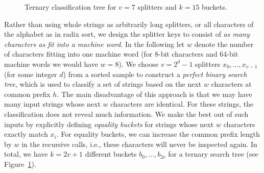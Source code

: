 \documentclass[a4paper]{myjournal}
\begin{document}
\begin{figure}[t]
   \caption{Ternary classification tree for $v = 7$ splitters and $k = 15$ buckets.}\label{fig:ternary-tree}
\end{figure}

Rather than using whole strings as arbitrarily long splitters, or all characters
of the alphabet as in radix sort, we design the splitter keys to consist of
\emph{as many characters as fit into a machine word}.  In the following let $w$
denote the number of characters fitting into one machine word (for 8-bit
characters and 64-bit machine words we would have $w=8$).  We choose $v=2^d-1$
splitters $x_0,\ldots,x_{v-1}$ (for some integer $d$) from a sorted sample to
construct a \emph{perfect binary search tree}, which is used to classify a set
of strings based on the next $w$ characters at common prefix $h$. The main
disadvantage of this approach is that we may have many input strings whose next
$w$ characters are identical.  For these strings, the classification does not
reveal much information. We make the best out of such inputs by explicitly
defining \emph{equality buckets} for strings whose next $w$ characters exactly
match $x_i$.  For equality buckets, we can increase the common prefix length by
$w$ in the recursive calls, i.e., these characters will never be inspected
again.  In total, we have $k = 2 v + 1$ different buckets $b_0,\ldots,b_{2v}$
for a ternary search tree (see Figure~\ref{fig:ternary-tree}).
\end{document}
